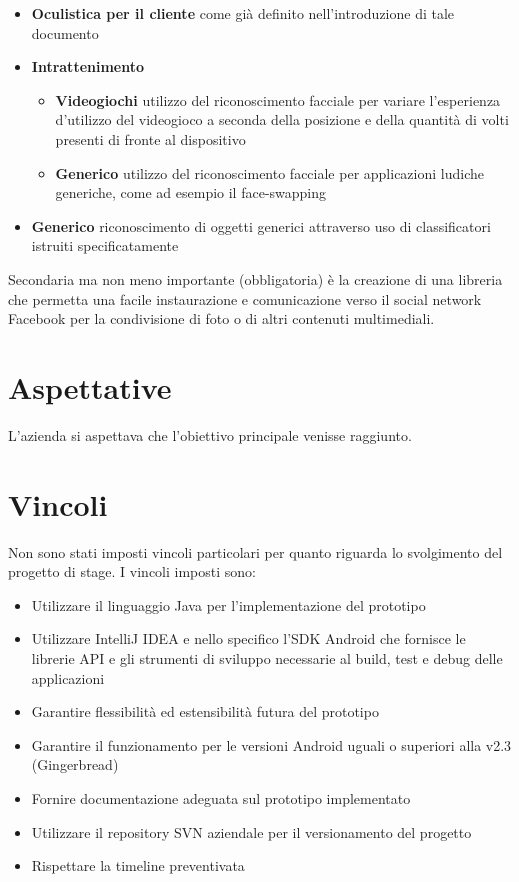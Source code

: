 \begin{itemize}
\item \textbf{Oculistica per il cliente} come già definito nell'introduzione di tale documento
\item \textbf{Intrattenimento}
\begin{itemize}
\item \textbf{Videogiochi} 
utilizzo del riconoscimento facciale per variare l'esperienza d'utilizzo del videogioco a seconda della posizione e della quantità di volti presenti di fronte al dispositivo
\item \textbf{Generico}
utilizzo del riconoscimento facciale per applicazioni ludiche generiche, come ad esempio il face-swapping
\end{itemize}
\item \textbf{Generico} riconoscimento di oggetti generici attraverso uso di classificatori istruiti specificatamente
\end{itemize}  

Secondaria ma non meno importante (obbligatoria) è la creazione di una libreria che permetta una facile instaurazione e comunicazione verso il social network Facebook per la condivisione di foto o di altri contenuti multimediali.


\section{Aspettative}

L'azienda si aspettava che l'obiettivo principale venisse raggiunto.


\section{Vincoli}

Non sono stati imposti vincoli particolari per quanto riguarda lo svolgimento del progetto di stage.
I vincoli imposti sono:
\begin{itemize}
 	\item Utilizzare il linguaggio Java per l'implementazione del prototipo
 	\item Utilizzare IntelliJ IDEA e nello specifico l'SDK Android che fornisce le librerie API e gli strumenti di sviluppo necessarie al build, test e debug delle applicazioni
 	\item Garantire flessibilità ed estensibilità futura del prototipo
 	\item Garantire il funzionamento per le versioni Android uguali o superiori alla v2.3 (Gingerbread)
 	\item Fornire documentazione adeguata sul prototipo implementato
 	\item Utilizzare il repository SVN aziendale per il versionamento del progetto
 	\item Rispettare la timeline preventivata
\end{itemize}

